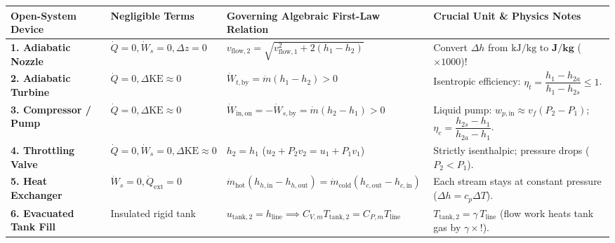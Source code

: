 \begin{formulacard}
\par\smallskip\noindent
\footnotesize\setlength{\tabcolsep}{3.5pt}\renewcommand{\arraystretch}{1.15}
\begin{tabularx}{\linewidth}{@{}l l l X@{}}
\toprule
\textbf{Open-System Device} & \textbf{Negligible Terms} & \textbf{Governing Algebraic First-Law Relation} & \textbf{Crucial Unit \& Physics Notes} \\
\midrule
\textbf{1. Adiabatic Nozzle} & $\dot{Q}=0, \dot{W}_s=0, \Delta z=0$ & $v_{\mathrm{flow},2} = \sqrt{v_{\mathrm{flow},1}^2 + 2(h_1 - h_2)}$ & Convert $\Delta h$ from $\si{\kilo\joule\per\kilogram}$ to $\mathbf{\si{\joule\per\kilogram}}$ ($\times 1000$)! \\
\textbf{2. Adiabatic Turbine} & $\dot{Q}=0, \Delta\mathrm{KE}\approx 0$ & $\dot{W}_{t,\mathrm{by}} = \dot{m}(h_1 - h_2) > 0$ & Isentropic efficiency: $\eta_t = \dfrac{h_1 - h_{2a}}{h_1 - h_{2s}} \le 1$. \\
\textbf{3. Compressor / Pump} & $\dot{Q}=0, \Delta\mathrm{KE}\approx 0$ & $\dot{W}_{\mathrm{in,on}} = -\dot{W}_{s,\mathrm{by}} = \dot{m}(h_2 - h_1) > 0$ & Liquid pump: $w_{p,\mathrm{in}} \approx v_f(P_2 - P_1)$; $\eta_c = \dfrac{h_{2s}-h_1}{h_{2a}-h_1}$. \\
\textbf{4. Throttling Valve} & $\dot{Q}=0, \dot{W}_s=0, \Delta\mathrm{KE}\approx 0$ & $h_2 = h_1$ ($u_2 + P_2 v_2 = u_1 + P_1 v_1$) & Strictly isenthalpic; pressure drops ($P_2 < P_1$). \\
\textbf{5. Heat Exchanger} & $\dot{W}_s=0, \dot{Q}_{\mathrm{ext}}=0$ & $\dot{m}_{\mathrm{hot}}(h_{h,\mathrm{in}} - h_{h,\mathrm{out}}) = \dot{m}_{\mathrm{cold}}(h_{c,\mathrm{out}} - h_{c,\mathrm{in}})$ & Each stream stays at constant pressure ($\Delta h = c_p\Delta T$). \\
\textbf{6. Evacuated Tank Fill} & Insulated rigid tank & $u_{\mathrm{tank},2} = h_{\mathrm{line}} \implies C_{V,m}T_{\mathrm{tank},2} = C_{P,m}T_{\mathrm{line}}$ & $\boxed{T_{\mathrm{tank},2} = \gamma\,T_{\mathrm{line}}}$ (flow work heats tank gas by $\gamma\times$!). \\
\bottomrule
\end{tabularx}
\end{formulacard}


